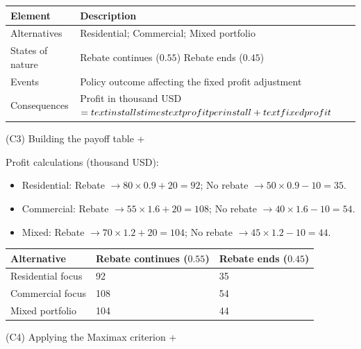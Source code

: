 \documentclass[11pt]{article}
\begin{document}
	
	\begin{center}
		\begin{tabular}{ll}
			\toprule
			Element & Description \\
			\midrule
			Alternatives & Residential; Commercial; Mixed portfolio \\
			States of nature & Rebate continues
			($0.55$)
			Rebate ends
			($0.45$) \\
			Events & Policy outcome affecting the fixed profit adjustment \\
			Consequences & Profit in thousand USD $= \\text{installs} \\times \\text{profit per install} + \\text{fixed profit}$ \\
			\bottomrule
		\end{tabular}
	\end{center}
	
	
	
	
	
	
	(C3) Building the payoff table
	+
	
	
	Profit calculations (thousand USD):
	\begin{itemize}
		\item Residential: Rebate $\to 80 \times 0.9 + 20 = 92$; No rebate $\to 50 \times 0.9 - 10 = 35$.
		\item Commercial: Rebate $\to 55 \times 1.6 + 20 = 108$; No rebate $\to 40 \times 1.6 - 10 = 54$.
		\item Mixed: Rebate $\to 70 \times 1.2 + 20 = 104$; No rebate $\to 45 \times 1.2 - 10 = 44$.
	\end{itemize}
	
	\begin{center}
		\begin{tabular}{lll}
			\toprule
			Alternative & Rebate continues
			($0.55$) & Rebate ends
			($0.45$) \\
			\midrule
			Residential focus & 92 & 35 \\
			Commercial focus & 108 & 54 \\
			Mixed portfolio & 104 & 44 \\
			\bottomrule
		\end{tabular}
	\end{center}
	
	
	
	
	
	
	(C4) Applying the Maximax criterion
	+
	
\end{document}
